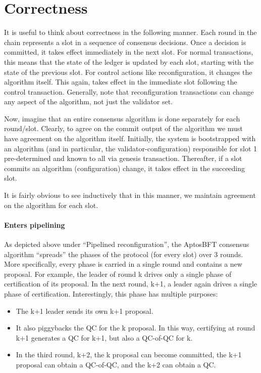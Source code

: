 \section{Correctness} \label{correctness}

It is useful to think about correctness in the following manner. Each round in the chain represents a slot in a sequence of consensus decisions.
Once a decision is committed, it takes effect immediately in the next slot. For normal transactions, this means that the state of the ledger is
updated by each slot, starting with the state of the previous slot. For control actions like reconfiguration, it changes the algorithm itself.
This again, takes effect in the immediate slot following the control transaction.
Generally, note that reconfiguration transactions can change any aspect of the algorithm, not just the validator set.

Now, imagine that an entire consensus algorithm is done separately for each round/slot. Clearly, to agree on the commit output of the algorithm
we must have agreement on the algorithm itself. Initially, the system is bootstrapped with an algorithm (and in particular, the
validator-configuration) responsible for slot 1 pre-determined and known to all via genesis transaction. Thereafter, if a slot commits an algorithm (configuration) change,
it takes effect in the succeeding slot.

It is fairly obvious to see inductively that in this manner, we maintain agreement on the algorithm for each slot.

\paragraph{Enters pipelining}

As depicted above under “Pipelined reconfiguration”, the AptosBFT consensus algorithm “spreads” the phases of the protocol (for every slot) over
3 rounds. More specifically, every phase is carried in a single round and contains a new proposal. For example, the leader of round k drives only
a single phase of certification of its proposal. In the next round, k+1, a leader again drives a single phase of certification. Interestingly,
this phase has multiple purposes:
\begin{itemize}
\item The k+1 leader sends its own k+1 proposal.
\item It also piggybacks the QC for the k proposal. In this way, certifying at round k+1 generates a QC for k+1, but also a QC-of-QC for k.
\item In the third round, k+2, the k proposal can become committed, the k+1 proposal can obtain a QC-of-QC, and the k+2 can obtain a QC.
\end{itemize}


